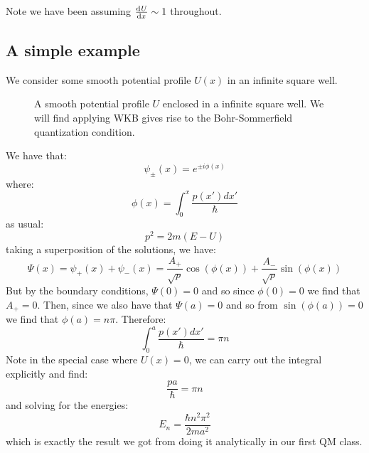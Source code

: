 Note we have been assuming $\od{U}{x} \sim 1$ throughout.

\subsection{A simple example}
We consider some smooth potential profile $U(x)$ in an infinite square well. 

\begin{figure}[htbp]
    \centering
    \caption{A smooth potential profile $U$ enclosed in a infinite square well. We will find applying WKB gives rise to the Bohr-Sommerfield quantization condition.}
    \label{fig-infinitesquarewellWKB}
\end{figure}

We have that:
\begin{equation}
    \psi_\pm (x) = e^{\pm i\phi(x)}
\end{equation}
where:
\begin{equation}
    \phi(x) = \int_0^x \frac{p(x')dx'}{\hbar}
\end{equation}
as usual:
\begin{equation}
    p^2 = 2m(E - U)
\end{equation}
taking a superposition of the solutions, we have:
\begin{equation}
    \Psi(x) = \psi_+(x) + \psi_-(x) = \frac{A_+}{\sqrt{p}}\cos(\phi(x)) + \frac{A_-}{\sqrt{p}}\sin(\phi(x))
\end{equation}
But by the boundary conditions, $\Psi(0) = 0$ and so since $\phi(0) = 0$ we find that $A_+ = 0$. Then, since we also have that $\Psi(a) = 0$ and so from $\sin(\phi(a)) = 0$ we find that $\phi(a) = n\pi$. Therefore:
\begin{equation}
    \int_0^a \frac{p(x')dx'}{\hbar} = \pi n
\end{equation}
Note in the special case where $U(x) = 0$, we can carry out the integral explicitly  and find:
\begin{equation}
    \frac{pa}{\hbar} = \pi n
\end{equation}
and solving for the energies:
\begin{equation}
    E_n = \frac{\hbar n^2\pi^2}{2ma^2}
\end{equation}
which is exactly the result we got from doing it analytically in our first QM class.

